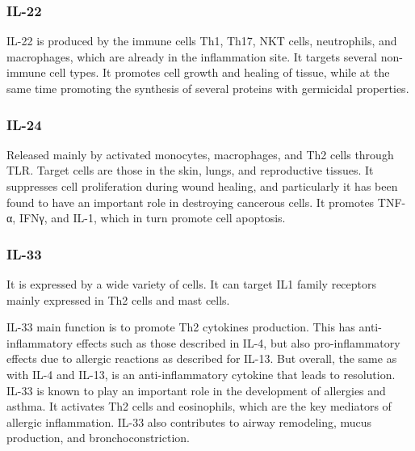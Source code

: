 

\subsubsection{IL-22}
\label{in:IL22}

IL-22 is produced by the immune cells Th1, Th17, NKT cells, neutrophils, and macrophages, which are already in the inflammation site. It targets several non-immune cell types. It promotes cell growth and healing of tissue, while at the same time promoting the synthesis of several proteins with germicidal properties.


\subsubsection{IL-24}
\label{in:IL24}

Released mainly by activated monocytes, macrophages, and Th2 cells through TLR. Target cells are those in the skin, lungs, and reproductive tissues. It suppresses cell proliferation during wound healing, and particularly it has been found to have an important role in destroying cancerous cells. It promotes TNF-α, IFNγ, and IL-1, which in turn promote cell apoptosis.

\subsubsection{IL-33}
\label{in:IL33}

It is expressed by a wide variety of cells. It can target IL1 family receptors mainly expressed in Th2 cells and mast cells.

IL-33 main function is to promote Th2 cytokines production. This has anti-inflammatory effects such as those described in IL-4, but also pro-inflammatory effects due to allergic reactions as described for IL-13. But overall, the same as with IL-4 and IL-13, is an anti-inflammatory cytokine that leads to resolution. IL-33 is known to play an important role in the development of allergies and asthma. It activates Th2 cells and eosinophils, which are the key mediators of allergic inflammation. IL-33 also contributes to airway remodeling, mucus production, and bronchoconstriction.

